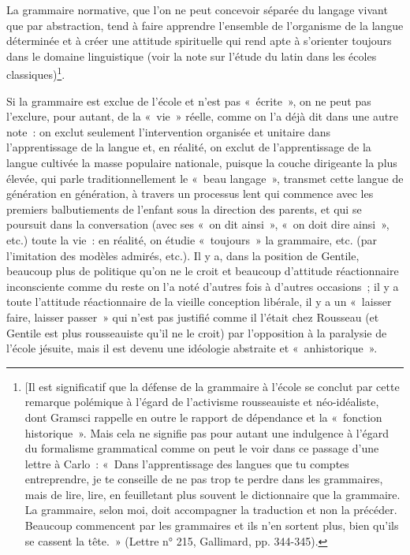 \documentclass[french,twoside]{book} %
\begin{document}
La grammaire normative, que l’on ne peut concevoir séparée du langage vivant que par abstraction, tend à faire apprendre l’ensemble de l’organisme de la langue déterminée et à créer une attitude spirituelle qui rend apte à s’orienter toujours dans le domaine linguistique (voir la note sur l’étude du latin dans les écoles classiques)\footnote{[Il est significatif que la défense de la grammaire à l’école se conclut par cette remarque polémique à l’égard de l’activisme rousseauiste et néo-idéaliste, dont Gramsci rappelle en outre le rapport de dépendance et la « fonction historique ». Mais cela ne signifie pas pour autant une indulgence à l’égard du formalisme grammatical comme on peut le voir dans ce passage d’une lettre à Carlo : « Dans l’apprentissage des langues que tu comptes entreprendre, je te conseille de ne pas trop te perdre dans les grammaires, mais de lire, lire, en feuilletant plus souvent le dictionnaire que la grammaire. La grammaire, selon moi, doit accompagner la traduction et non la précéder. Beaucoup commencent par les grammaires et ils n’en sortent plus, bien qu’ils se cassent la tête. » (Lettre n° 215, Gallimard, pp. 344-345).}.\par
Si la grammaire est exclue de l’école et n’est pas « écrite », on ne peut pas l’exclure, pour autant, de la « vie » réelle, comme on l’a déjà dit dans une autre note : on exclut seulement l’intervention organisée et unitaire dans l’apprentissage de la langue et, en réalité, on exclut de l’apprentissage de la langue cultivée la masse populaire nationale, puisque la couche dirigeante la plus élevée, qui parle traditionnellement le « beau langage », transmet cette langue de génération en génération, à travers un processus lent qui commence avec les premiers balbutiements de l’enfant sous la direction des parents, et qui se poursuit dans la conversation (avec ses « on dit ainsi », « on doit dire ainsi », etc.) toute la vie : en réalité, on étudie « toujours » la grammaire, etc. (par l’imitation des modèles admirés, etc.). Il y a, dans la position de Gentile, beaucoup plus de politique qu’on ne le croit et beaucoup d’attitude réactionnaire inconsciente comme du reste on l’a noté d’autres fois à d’autres occasions ; il y a toute l’attitude réactionnaire de la vieille conception libérale, il y a un « laisser faire, laisser passer » qui n’est pas justifié comme il l’était chez Rousseau (et Gentile est plus rousseauiste qu’il ne le croit) par l’opposition à la paralysie de l’école jésuite, mais il est devenu une idéologie abstraite et « anhistorique ».
\end{document}
